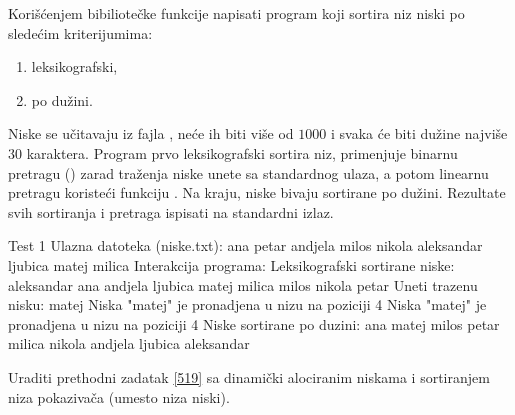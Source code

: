 \begin{Answer}[ref=518]
\end{Answer}
\begin{Exercise}[label=519]
   Korišćenjem bibiliotečke funkcije  napisati program
   koji sortira niz niski po sledećim kriterijumima:
   \begin{enumerate}
   \item leksikografski,
   \item po dužini.
   \end{enumerate}
   Niske se učitavaju iz fajla , neće ih biti više od
   $1000$ i svaka će biti dužine najviše $30$ karaktera. Program prvo
   leksikografski sortira niz, primenjuje binarnu pretragu
   () zarad traženja niske unete sa standardnog ulaza,
   a potom linearnu pretragu koristeći funkciju . Na
   kraju, niske bivaju sortirane po dužini. Rezultate svih sortiranja
   i pretraga ispisati na standardni izlaz.
   
\begin{maxitest}
\begin{test}{Test 1}
Ulazna datoteka (niske.txt):
  ana petar andjela milos nikola aleksandar ljubica matej milica
Interakcija programa:
  Leksikografski sortirane niske:
  aleksandar ana andjela ljubica matej milica milos nikola petar 
  Uneti trazenu nisku: matej
  Niska "matej" je pronadjena u nizu na poziciji 4
  Niska "matej" je pronadjena u nizu na poziciji 4
  Niske sortirane po duzini:
  ana matej milos petar milica nikola andjela ljubica aleksandar
\end{test}
\end{maxitest}
  
\end{Exercise}

\begin{Answer}[ref=519]
\end{Answer}
\begin{Exercise}[label=520]
  Uraditi prethodni zadatak \ref{519} sa dinamički alociranim niskama
  i sortiranjem niza pokazivača (umesto niza niski).
  
\end{Exercise}


